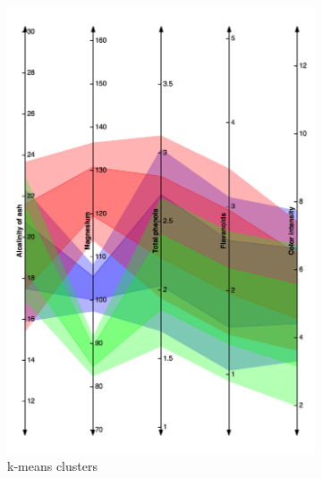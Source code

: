 \documentclass[10pt,a4paper]{article}
\begin{document}
\begin{figure}
		\label{fig:comparekm}
        \centering
        \begin{subfigure}[b]{0.45\textwidth}
                \includegraphics[width=\textwidth]{wine-kmeans}
                \caption{k-means clusters}
                \label{fig:winekm}
        \end{subfigure}%
        ~ %
        \begin{subfigure}[b]{0.45\textwidth}

\end{subfigure}
\end{figure}
\end{document}
